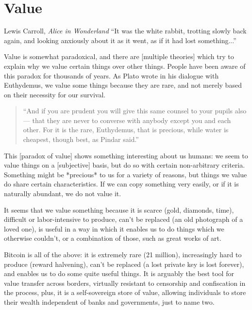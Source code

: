 \chapter{ Value}
\label{les:10}

\begin{chapquote}{Lewis Carroll, \textit{Alice in Wonderland}}
``It was the white rabbit, trotting slowly back again, and looking anxiously
about it as it went, as if it had lost something...''
\end{chapquote}

Value is somewhat paradoxical, and there are [multiple theories] which
try to explain why we value certain things over other things. People
have been aware of this paradox for thousands of years. As Plato wrote
in his dialogue with Euthydemus, we value some things because they are
rare, and not merely based on their necessity for our survival.

\begin{quotation}
``And if you are prudent you will give this same counsel to your pupils
also --- that they are never to converse with anybody except you and
each other. For it is the rare, Euthydemus, that is precious, while
water is cheapest, though best, as Pindar said.''
\end{quotation}

This [paradox of value] shows something interesting about us humans: we
seem to value things on a [subjective] basis, but do so with certain
non-arbitrary criteria. Something might be *precious* to us for a
variety of reasons, but things we value do share certain
characteristics. If we can copy something very easily, or if it is
naturally abundant, we do not value it.

It seems that we value something because it is scarce (gold, diamonds,
time), difficult or labor-intensive to produce, can't be replaced (an
old photograph of a loved one), is useful in a way in which it enables
us to do things which we otherwise couldn't, or a combination of those,
such as great works of art.

Bitcoin is all of the above: it is extremely rare (21 million),
increasingly hard to produce (reward halvening), can't be replaced (a
lost private key is lost forever), and enables us to do some quite
useful things. It is arguably the best tool for value transfer across
borders, virtually resistant to censorship and confiscation in the
process, plus, it is a self-sovereign store of value, allowing
individuals to store their wealth independent of banks and governments,
just to name two.

